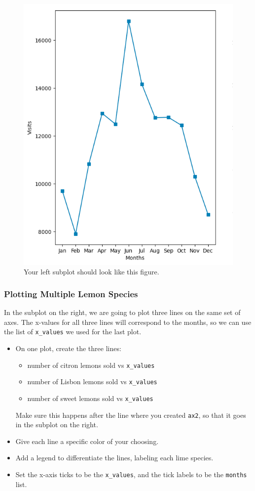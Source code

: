 \documentclass[a4paper]{article}
\begin{document}
\begin{figure}[htb]
\centering
\includegraphics[height=0.8\textwidth]{visits_per_month.png}
\caption{Your left subplot should look like this figure.}\label{fig:visits}
\end{figure}

\subsubsection{Plotting Multiple Lemon Species}
In the subplot on the right, we are going to plot three lines on the same set of axes. The x-values for all three lines will correspond to the months, so we can use the list of \texttt{x\_values} we used for the last plot.

\begin{itemize}
\item 
     On one plot, create the three lines:
    \begin{itemize}
        \item 
        number of citron lemons sold vs \texttt{x\_values}
        \item
        number of Lisbon lemons sold vs \texttt{x\_values}
        \item
        number of sweet lemons sold vs \texttt{x\_values}
    \end{itemize}{}

Make sure this happens after the line where you created \texttt{ax2}, so that it goes in the subplot on the right.

\item
Give each line a specific color of your choosing.

\item
Add a legend to differentiate the lines, labeling each lime species.

\item
Set the x-axis ticks to be the \texttt{x\_values}, and the tick labels to be the \texttt{months} list.
\end{itemize}{}
\end{document}

